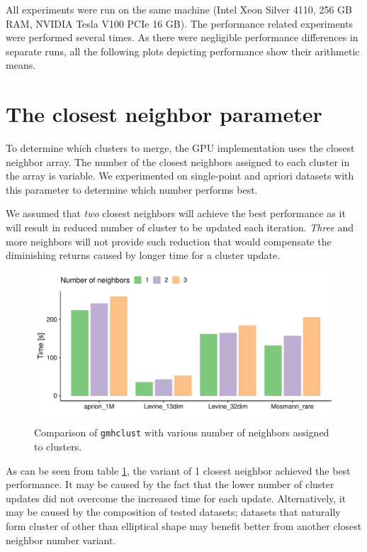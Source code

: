 All experiments were run on the same machine (Intel Xeon Silver 4110, 256 GB RAM, NVIDIA Tesla V100 PCIe 16 GB). The performance related experiments were performed several times. As there were negligible performance differences in separate runs, all the following plots depicting performance show their arithmetic means. 

\section{The closest neighbor parameter}

To determine which clusters to merge, the GPU implementation uses the closest neighbor array. The number of the closest neighbors assigned to each cluster in the array is variable. We experimented on single-point and apriori datasets with this parameter to determine which number performs best. 

We assumed that \emph{two} closest neighbors will achieve the best performance as it will result in reduced number of cluster to be updated each iteration. \emph{Three} and more neighbors will not provide such reduction that would compensate the diminishing returns caused by longer time for a cluster update.

\begin{figure}\centering
	\includegraphics[width=\linewidth]{img/neighbor_compare}
	\caption{Comparison of \texttt{gmhclust} with various number of neighbors assigned to clusters.}
	\label{fig04:neigh}
\end{figure}

As can be seen from table \ref{fig04:neigh}, the variant of 1 closest neighbor achieved the best performance. It may be caused by the fact that the lower number of cluster updates did not overcome the increased time for each update. Alternatively, it may be caused by the composition of tested datasets; datasets that naturally form cluster of other than elliptical shape may benefit better from another closest neighbor number variant.

